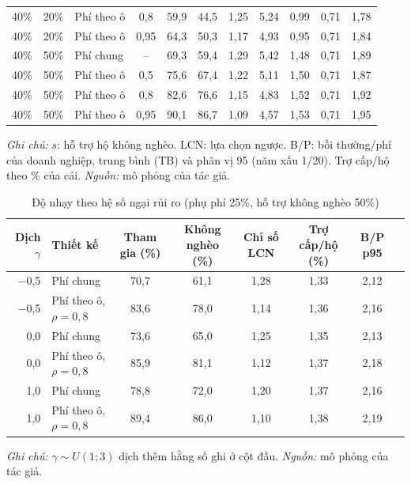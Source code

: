 \documentclass[12pt,a4paper]{article}
\begin{document}
\begin{table}[!tbp]
\begin{tabular}{@{}cllcrrrrrrr@{}}
40\% & 20\% & Phí theo ô & 0,8 & 59,9 & 44,5 & 1,25 & 5,24 & 0,99 & 0,71 & 1,78 \\
40\% & 20\% & Phí theo ô & 0,95 & 64,3 & 50,3 & 1,17 & 4,93 & 0,95 & 0,71 & 1,84 \\
40\% & 50\% & Phí chung & -- & 69,3 & 59,4 & 1,29 & 5,42 & 1,48 & 0,71 & 1,89 \\
40\% & 50\% & Phí theo ô & 0,5 & 75,6 & 67,4 & 1,22 & 5,11 & 1,50 & 0,71 & 1,87 \\
40\% & 50\% & Phí theo ô & 0,8 & 82,6 & 76,6 & 1,15 & 4,83 & 1,52 & 0,71 & 1,92 \\
40\% & 50\% & Phí theo ô & 0,95 & 90,1 & 86,7 & 1,09 & 4,57 & 1,53 & 0,71 & 1,95 \\
\bottomrule
\end{tabular}
\begin{minipage}{\textwidth}\footnotesize
\textit{Ghi chú:} $s$: hỗ trợ hộ không nghèo. LCN: lựa chọn ngược. B/P: bồi thường/phí của doanh nghiệp, trung bình (TB) và phân vị 95 (năm xấu 1/20). Trợ cấp/hộ theo \% của cải. \textit{Nguồn:} mô phỏng của tác giả.
\end{minipage}
\end{table}

\begin{table}[!tbp]
\centering\footnotesize
\caption{Độ nhạy theo hệ số ngại rủi ro (phụ phí 25\%, hỗ trợ không nghèo 50\%)}
\label{tab:gamma}
\begin{tabular}{@{}rlcccccc@{}}
\toprule
Dịch $\gamma$ & Thiết kế & Tham gia (\%) & Không nghèo (\%) & Chỉ số LCN & Trợ cấp/hộ (\%) & B/P p95 \\
\midrule
$-$0,5 & Phí chung & 70,7 & 61,1 & 1,28 & 1,33 & 2,12 \\
$-$0,5 & Phí theo ô, $\rho=0{,}8$ & 83,6 & 78,0 & 1,14 & 1,36 & 2,16 \\
0,0 & Phí chung & 73,6 & 65,0 & 1,25 & 1,35 & 2,13 \\
0,0 & Phí theo ô, $\rho=0{,}8$ & 85,9 & 81,1 & 1,12 & 1,37 & 2,18 \\
1,0 & Phí chung & 78,8 & 72,0 & 1,20 & 1,37 & 2,16 \\
1,0 & Phí theo ô, $\rho=0{,}8$ & 89,4 & 86,0 & 1,10 & 1,38 & 2,19 \\
\bottomrule
\end{tabular}
\begin{minipage}{\textwidth}\footnotesize
\textit{Ghi chú:} $\gamma\sim U(1;3)$ dịch thêm hằng số ghi ở cột đầu. \textit{Nguồn:} mô phỏng của tác giả.
\end{minipage}
\end{table}
\end{document}
